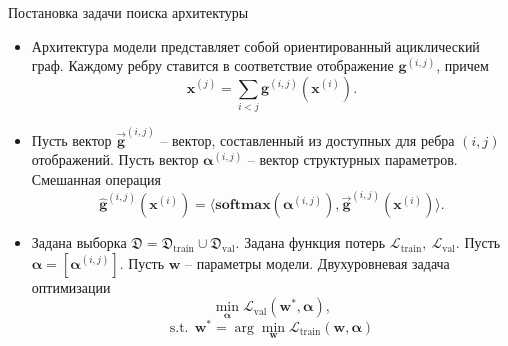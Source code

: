 \documentclass[aspectratio=169]{beamer}
\begin{document}
\begin{frame}{Постановка задачи поиска архитектуры}
\begin{itemize}
\item Архитектура модели представляет собой ориентированный ациклический граф. Каждому ребру ставится в соответствие отображение $\boldsymbol{g}^{(i, j)}$, причем
\[
\boldsymbol x^{(j)} = \sum_{i < j}\boldsymbol{g}^{(i, j)}(\boldsymbol{x}^{(i)}).
\]
\item Пусть вектор $\vec{\boldsymbol g}^{(i, j)}$ -- вектор, составленный из доступных для ребра $(i, j)$ отображений. Пусть вектор $\boldsymbol\alpha^{(i, j)}$ -- вектор структурных параметров. Смешанная операция
\[
\hat{\boldsymbol g}^{(i, j)}(\boldsymbol x^{(i)}) = \langle\boldsymbol{softmax}(\boldsymbol \alpha^{(i, j)}), \vec{\boldsymbol g}^{(i, j)}(\boldsymbol{x}^{(i)})\rangle.
\]
\item Задана выборка $\mathfrak{D} = \mathfrak{D}_\text{train} \cup \mathfrak{D}_\text{val}$. Задана функция потерь $\mathcal{L}_\text{train}, ~\mathcal{L}_\text{val}$. Пусть $\boldsymbol\alpha = [\boldsymbol\alpha^{(i, j)}]$. Пусть $\boldsymbol w$ -- параметры модели. Двухуровневая задача оптимизации
\[
\min_{\boldsymbol\alpha}\mathcal{L}_\text{val}(\boldsymbol w^*, \boldsymbol\alpha),
\]
\[
\mathrm{s.t.} ~~\boldsymbol w^* = \arg\min_{\boldsymbol w}\mathcal{L}_\text{train}(\boldsymbol w, \boldsymbol\alpha)
\]
\end{itemize}
\end{frame}
\end{document}
